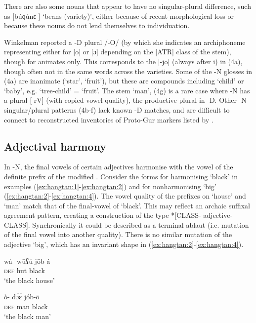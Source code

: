 \documentclass[output=paper,
modfonts
]{langscibook}
\begin{document}
There are also some nouns that appear to have no singular-plural difference, such as [búɡúnɛ ] ‘beans (variety)’, either because of recent morphological loss or because these nouns do not lend themselves to individuation.

Winkelman reported a -D plural /-O/ (by which she indicates an archiphoneme representing either for [o] or [ɔ] depending on the [ATR] class of the stem), though for animates only. This corresponds to the [-j\=o] (always after i) in (4a), though often not in the same words across the  varieties.  Some of the -N glosses in (4a) are inanimate (‘star’, ‘fruit’), but these are compounds including ‘child’ or ‘baby’, e.g. ‘tree-child’ = ‘fruit’. The stem ‘man’, (4g) is a rare case where -N has a plural [-rV] (with copied vowel quality), the productive plural in -D. Other -N singular/plural patterns (4b-f) lack known -D matches, and are difficult to connect to reconstructed inventories of Proto-Gur  markers listed by \citet{Naden1989}.

\subsection{Adjectival harmony}\label{sec:hangtan:3.3}

In -N, the final vowels of certain adjectives harmonise with the vowel of the definite prefix of the modified . Consider the forms for harmonising ‘black’ in examples (\ref{ex:hangtan:1}-\ref{ex:hangtan:2}) and for nonharmonising ‘big’ (\ref{ex:hangtan:2}-\ref{ex:hangtan:4}). The vowel quality of the prefixes on ‘house’ and ‘man’ match that of the final-vowel of ‘black’. This may reflect an archaic suffixal agreement pattern, creating a construction of the type *[CLASS- adjective-CLASS]. Synchronically it could be described as a terminal ablaut (i.e. mutation of the final vowel into another quality). There is no similar mutation of the adjective ‘big’, which has an invariant shape in (\ref{ex:hangtan:2}-\ref{ex:hangtan:4}).

\ea\label{ex:hangtan:1}
\gll wà-          wūʕú j\=ob-á\\
     \textsc{def} hut black\\
\glt ‘the black house’
\z

\ea\label{ex:hangtan:2}
\gll ò-           d\`{ɔ}\`{ɛ} jób-\=o\\
     \textsc{def} man black\\
\glt ‘the black man’
\z
\end{document}
